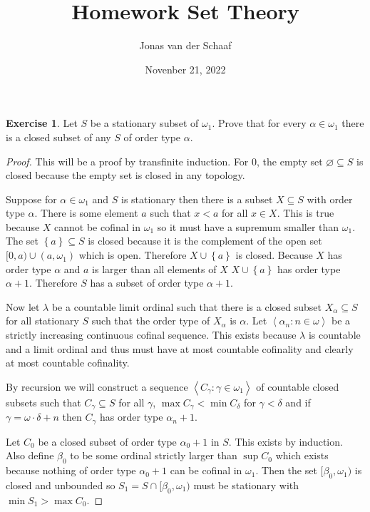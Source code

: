 \documentclass{article}
\title{Homework Set Theory}
\date{Novenber 21, 2022}
\author{Jonas van der Schaaf}
\theoremstyle{definition}
\newtheorem{question}{Exercise}
\newcommand{\set}[1]{\left\{#1\right\}}
\newcommand{\sequence}[2]{\left<#1:#2\right>}
\begin{document}
\maketitle

\begin{question}
    Let \(S\) be a stationary subset of \(\omega_{1}\). Prove that for every
    \(\alpha\in\omega_{1}\) there is a closed subset of any \(S\) of order type
    \(\alpha\).

    \begin{proof}
        This will be a proof by transfinite induction. For \(0\), the empty set
        \(\varnothing\subseteq S\) is closed because the empty set is closed in
        any topology.

        Suppose for \(\alpha\in\omega_{1}\) and \(S\) is stationary then there
        is a subset \(X\subseteq S\) with order type \(\alpha\). There is some
        element \(a\) such that \(x<a\) for all \(x\in X\). This is true because
        \(X\) cannot be cofinal in \(\omega_{1}\) so it must have a supremum
        smaller than \(\omega_{1}\). The set \(\set{a}\subseteq S\) is closed
        because it is the complement of the open set \([0,a)\cup(a,\omega_{1})\)
        which is open. Therefore \(X\cup\set{a}\) is closed. Because \(X\) has
        order type \(\alpha\) and \(a\) is larger than all elements of \(X\)
        \(X\cup\set{a}\) has order type \(\alpha+1\). Therefore \(S\) has a
        subset of order type \(\alpha+1\).

        Now let \(\lambda\) be a countable limit ordinal such that there is a
        closed subset \(X_{\alpha}\subseteq S\) for all stationary \(S\) such
        that the order type of \(X_{\alpha}\) is \(\alpha\). Let
        \(\sequence{\alpha_{n}}{n\in\omega}\) be a strictly increasing
        continuous cofinal sequence. This exists because \(\lambda\) is
        countable and a limit ordinal and thus must have at most countable
        cofinality and clearly at most countable cofinality.

        By recursion we will construct a sequence
        \(\sequence{C_{\gamma}}{\gamma\in\omega_{1}}\) of countable closed
        subsets such that \(C_{\gamma}\subseteq S\) for all \(\gamma\), \(\max
        C_{\gamma}<\min C_{\delta}\) for \(\gamma<\delta\) and if
        \(\gamma=\omega\cdot\delta+n\) then \(C_{\gamma}\) has order type
        \(\alpha_{n}+1\).

        Let \(C_{0}\) be a closed subset of order type \(\alpha_{0}+1\) in
        \(S\). This exists by induction. Also define \(\beta_{0}\) to be some
        ordinal strictly larger than \(\sup C_{0}\) which exists because nothing
        of order type \(\alpha_{0}+1\) can be cofinal in \(\omega_{1}\). Then
        the set \([\beta_{0},\omega_{1})\) is closed and unbounded so
        \(S_{1}=S\cap[\beta_{0},\omega_{1})\) must be stationary with \(\min
        S_{1}>\max C_{0}\).


\end{proof}
\end{question}
\end{document}
